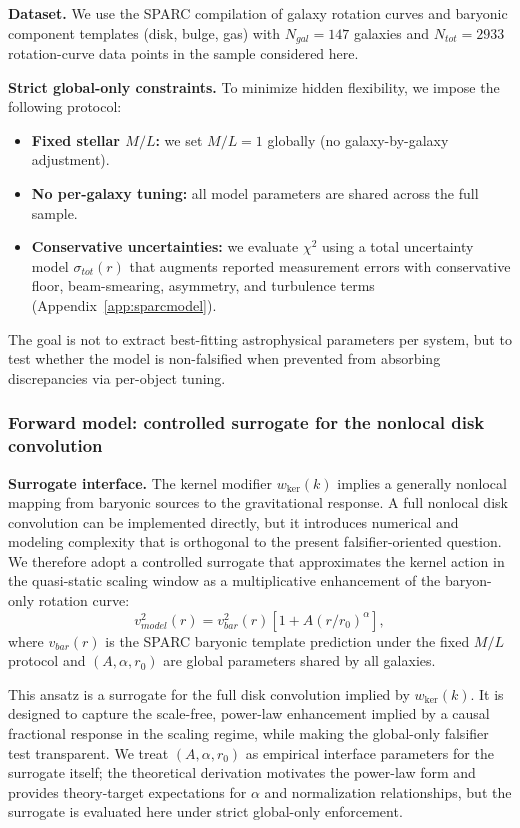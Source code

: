 \documentclass[entropy,article,submit,pdftex,moreauthors]{Definitions/mdpi}
\begin{document}
\textbf{Dataset.} We use the SPARC compilation of galaxy rotation curves and baryonic component templates (disk, bulge, gas) with $N_{gal} = 147$
galaxies and $N_{tot} = 2933$ rotation-curve data points in the sample considered here.

\textbf{Strict global-only constraints.} To minimize hidden flexibility, we impose the following protocol:
\begin{itemize}[itemsep=2pt]
    \item \textbf{Fixed stellar $M/L$:} we set $M/L = 1$ globally (no galaxy-by-galaxy adjustment).
    \item \textbf{No per-galaxy tuning:} all model parameters are shared across the full sample.
    \item \textbf{Conservative uncertainties:} we evaluate $\chi^2$ using a total uncertainty model $\sigma_{tot}(r)$ that augments reported measurement errors with conservative floor, beam-smearing, asymmetry, and turbulence terms (Appendix~\ref{app:sparcmodel}).
\end{itemize}

The goal is not to extract best-fitting astrophysical parameters per system, but to test whether the model is non-falsified when prevented from absorbing discrepancies via per-object tuning.

\subsubsection{Forward model: controlled surrogate for the nonlocal disk convolution}
\label{subsubsec:forwardmodel}

\textbf{Surrogate interface.} The kernel modifier $w_{\mathrm{ker}}(k)$ implies a generally nonlocal mapping from baryonic sources to the gravitational response. A full nonlocal disk convolution can be implemented directly, but it introduces numerical and modeling complexity that is orthogonal to the present falsifier-oriented question. We therefore adopt a controlled surrogate that approximates the kernel action in the quasi-static scaling window as a multiplicative enhancement of the baryon-only rotation curve:
\begin{equation}
    v^2_{model}(r) = v^2_{bar}(r) [1 + A(r/r_0)^\alpha],
    \label{eq:baryon_ansatz}
\end{equation}
where $v_{bar}(r)$ is the SPARC baryonic template prediction under the fixed $M/L$ protocol and $(A, \alpha, r_0)$ are global parameters shared by all galaxies.

This ansatz is a surrogate for the full disk convolution implied by $w_{\mathrm{ker}}(k)$. It is designed to capture the scale-free, power-law enhancement implied by a causal fractional response in the scaling regime, while making the global-only falsifier test transparent. We treat $(A, \alpha, r_0)$ as empirical interface parameters for the surrogate itself; the theoretical derivation motivates the power-law form and provides theory-target expectations for 
$\alpha$ and normalization relationships, but the surrogate is evaluated here under strict global-only enforcement.
\end{document}
